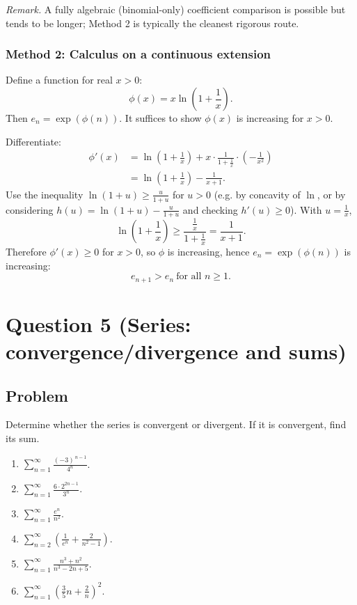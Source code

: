 \documentclass[12pt]{article}
\begin{document}
\smallskip
\noindent
\textit{Remark.} A fully algebraic (binomial-only) coefficient comparison is possible but tends to be longer; Method 2 is typically the cleanest rigorous route.

\subsubsection*{Method 2: Calculus on a continuous extension}

Define a function for real \(x>0\):
\[
\phi(x)=x\ln\left(1+\frac{1}{x}\right).
\]
Then \(e_n=\exp(\phi(n))\). It suffices to show \(\phi(x)\) is increasing for \(x>0\).

Differentiate:
\begin{align*}
\phi'(x)
&=\ln\left(1+\frac{1}{x}\right)+x\cdot \frac{1}{1+\frac{1}{x}}\cdot\left(-\frac{1}{x^2}\right)\\
&=\ln\left(1+\frac{1}{x}\right)-\frac{1}{x+1}.
\end{align*}
Use the inequality \(\ln(1+u)\ge \frac{u}{1+u}\) for \(u>0\) (e.g. by concavity of \(\ln\), or by considering \(h(u)=\ln(1+u)-\frac{u}{1+u}\) and checking \(h'(u)\ge 0\)). With \(u=\frac{1}{x}\),
\[
\ln\left(1+\frac{1}{x}\right)\ge \frac{\frac{1}{x}}{1+\frac{1}{x}}=\frac{1}{x+1}.
\]
Therefore \(\phi'(x)\ge 0\) for \(x>0\), so \(\phi\) is increasing, hence \(e_n=\exp(\phi(n))\) is increasing:
\[
\boxed{e_{n+1}>e_n\ \text{for all }n\ge 1.}
\]

\newpage


\section*{Question 5 (Series: convergence/divergence and sums)}

\subsection*{Problem}
Determine whether the series is convergent or divergent. If it is convergent, find its sum.
\begin{enumerate}[label=(\roman*)]
\item \(\displaystyle \sum_{n=1}^{\infty}\frac{(-3)^{\,n-1}}{4^{n}}\).
\item \(\displaystyle \sum_{n=1}^{\infty}\frac{6\cdot 2^{2n-1}}{3^{n}}\).
\item \(\displaystyle \sum_{n=1}^{\infty}\frac{e^{n}}{n^{2}}\).
\item \(\displaystyle \sum_{n=2}^{\infty}\left(\frac{1}{e^{n}}+\frac{2}{n^{2}-1}\right)\).
\item \(\displaystyle \sum_{n=1}^{\infty}\frac{n^{3}+n^{2}}{n^{3}-2n+5}\).
\item \(\displaystyle \sum_{n=1}^{\infty}\left(\frac{3}{5}n+\frac{2}{n}\right)^{2}\).
\end{enumerate}
\end{document}
